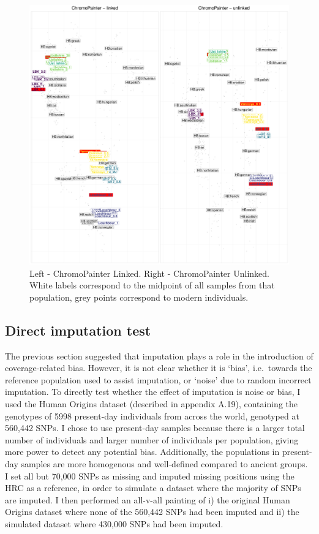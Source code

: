 \begin{figure}[htp]
    \centering
    \includegraphics[width=1.0\textwidth]{../images/chapter1/CP_linked_unlinked.pdf}
    \caption{Left - ChromoPainter Linked. Right - ChromoPainter Unlinked. White labels correspond to the midpoint of all samples from that population, grey points correspond to modern individuals.}
    \label{fig:pre_GLIMPSE_PCA}
\end{figure}

\subsection{Direct imputation test} \label{DirectImputationTest}

The previous section suggested that imputation plays a role in the introduction of coverage-related bias. However, it is not clear whether it is `bias', i.e.\ towards the reference population used to assist imputation, or `noise' due to random incorrect imputation. To directly test whether the effect of imputation is noise or bias, I used the Human Origins dataset (described in appendix A.19), containing the genotypes of 5998 present-day individuals from across the world, genotyped at 560,442 SNPs. I chose to use present-day samples because there is a larger total number of individuals and larger number of individuals per population, giving more power to detect any potential bias. Additionally, the populations in present-day samples are more homogenous and well-defined compared to ancient groups. I set all but 70,000 SNPs as missing and imputed missing positions using the HRC as a reference, in order to simulate a dataset where the majority of SNPs are imputed. I then performed an all-v-all painting of i) the original Human Origins dataset where none of the 560,442 SNPs had been imputed and ii) the simulated dataset where 430,000 SNPs had been imputed. 

